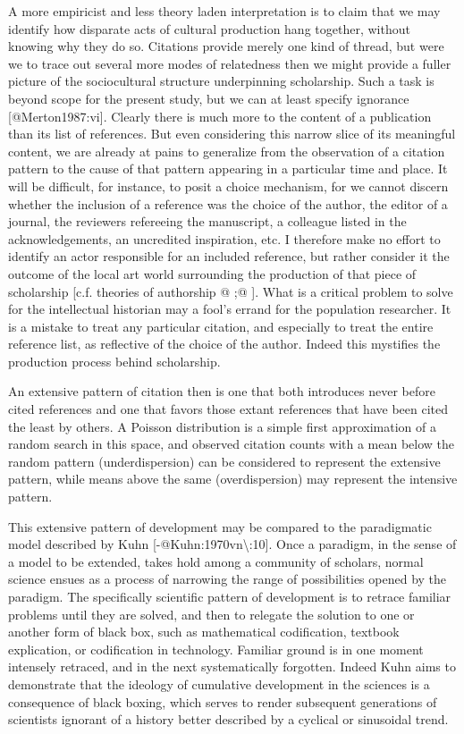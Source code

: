 \documentclass[]{article}
\begin{document}
A more empiricist and less theory laden interpretation is to claim that
we may identify how disparate acts of cultural production hang together,
without knowing why they do so. Citations provide merely one kind of
thread, but were we to trace out several more modes of relatedness then
we might provide a fuller picture of the sociocultural structure
underpinning scholarship. Such a task is beyond scope for the present
study, but we can at least specify ignorance {[}@Merton1987:vi{]}.
Clearly there is much more to the content of a publication than its list
of references. But even considering this narrow slice of its meaningful
content, we are already at pains to generalize from the observation of a
citation pattern to the cause of that pattern appearing in a particular
time and place. It will be difficult, for instance, to posit a choice
mechanism, for we cannot discern whether the inclusion of a reference
was the choice of the author, the editor of a journal, the reviewers
refereeing the manuscript, a colleague listed in the acknowledgements,
an uncredited inspiration, etc. I therefore make no effort to identify
an actor responsible for an included reference, but rather consider it
the outcome of the local art world surrounding the production of that
piece of scholarship {[}c.f. theories of authorship @ ;@ {]}. What is a
critical problem to solve for the intellectual historian may a fool's
errand for the population researcher. It is a mistake to treat any
particular citation, and especially to treat the entire reference list,
as reflective of the choice of the author. Indeed this mystifies the
production process behind scholarship.

An extensive pattern of citation then is one that both introduces never
before cited references and one that favors those extant references that
have been cited the least by others. A Poisson distribution is a simple
first approximation of a random search in this space, and observed
citation counts with a mean below the random pattern (underdispersion)
can be considered to represent the extensive pattern, while means above
the same (overdispersion) may represent the intensive pattern.

This extensive pattern of development may be compared to the
paradigmatic model described by Kuhn
{[}-@Kuhn:1970vn\textbackslash{}:10{]}. Once a paradigm, in the sense of
a model to be extended, takes hold among a community of scholars, normal
science ensues as a process of narrowing the range of possibilities
opened by the paradigm. The specifically scientific pattern of
development is to retrace familiar problems until they are solved, and
then to relegate the solution to one or another form of black box, such
as mathematical codification, textbook explication, or codification in
technology. Familiar ground is in one moment intensely retraced, and in
the next systematically forgotten. Indeed Kuhn aims to demonstrate that
the ideology of cumulative development in the sciences is a consequence
of black boxing, which serves to render subsequent generations of
scientists ignorant of a history better described by a cyclical or
sinusoidal trend.
\end{document}
